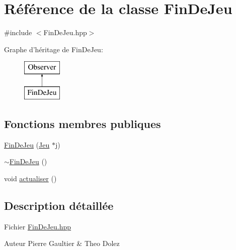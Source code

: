 \hypertarget{class_fin_de_jeu}{\section{Référence de la classe Fin\-De\-Jeu}
\label{class_fin_de_jeu}
}


{\ttfamily \#include $<$Fin\-De\-Jeu.\-hpp$>$}

Graphe d'héritage de Fin\-De\-Jeu\-:\begin{figure}[H]
\begin{center}
\leavevmode
\includegraphics[height=2.000000cm]{class_fin_de_jeu}
\end{center}
\end{figure}
\subsection*{Fonctions membres publiques}
\begin{DoxyCompactItemize}
\item 
\hyperlink{class_fin_de_jeu_af86c4d468aec3ffb9ed59c02016aadcf}{Fin\-De\-Jeu} (\hyperlink{class_jeu}{Jeu} $\ast$j)
\item 
\hyperlink{class_fin_de_jeu_a7f80425c93ed96eadb13ac5e7bb51bd4}{$\sim$\-Fin\-De\-Jeu} ()
\item 
void \hyperlink{class_fin_de_jeu_ad68feabf9ef25fe143e230ee1b2e523b}{actualiser} ()
\end{DoxyCompactItemize}


\subsection{Description détaillée}
Fichier \hyperlink{_fin_de_jeu_8hpp}{Fin\-De\-Jeu.\-hpp} \begin{DoxyAuthor}{Auteur}
Pierre Gaultier \& Theo Dolez 
\end{DoxyAuthor}


